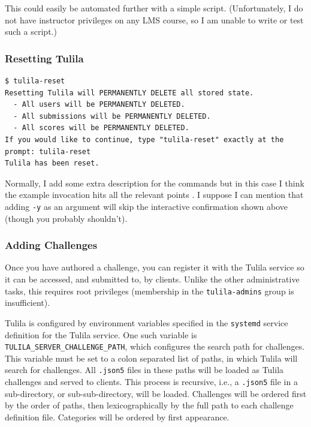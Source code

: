 \documentclass[12pt]{article}
\begin{document}
This could easily be automated further with a simple script. (Unfortunately, I do not have instructor privileges on any LMS course, so I am unable to write or test such a script.)

\subsubsection{Resetting Tulila}
\label{section:resetting-tulila}

\begin{Verbatim}
$ tulila-reset
Resetting Tulila will PERMANENTLY DELETE all stored state.
  - All users will be PERMANENTLY DELETED.
  - All submissions will be PERMANENTLY DELETED.
  - All scores will be PERMANENTLY DELETED.
If you would like to continue, type "tulila-reset" exactly at the prompt: tulila-reset
Tulila has been reset.
\end{Verbatim}

Normally, I add some extra description for the commands but in this case I think the example invocation hits all the relevant points . I suppose I can mention that adding \texttt{-y} as an argument will skip the interactive confirmation shown above (though you probably shouldn't).

\subsubsection{Adding Challenges}
\label{section:adding-challenges}

Once you have authored a challenge, you can register it with the Tulila service so it can be accessed, and submitted to, by clients. Unlike the other administrative tasks, this requires root privileges (membership in the \texttt{tulila-admins} group is insufficient).


Tulila is configured by environment variables specified in the \texttt{systemd} service definition for the Tulila service. One such variable is \texttt{TULILA\_SERVER\_CHALLENGE\_PATH}, which configures the search path for challenges. This variable must be set to a colon separated list of paths, in which Tulila will search for challenges. All \texttt{.json5} files in these paths will be loaded as Tulila challenges and served to clients. This process is recursive, i.e., a \texttt{.json5} file in a sub-directory, or sub-sub-directory, will be loaded. Challenges will be ordered first by the order of paths, then lexicographically by the full path to each challenge definition file. Categories will be ordered by first appearance.
\end{document}
